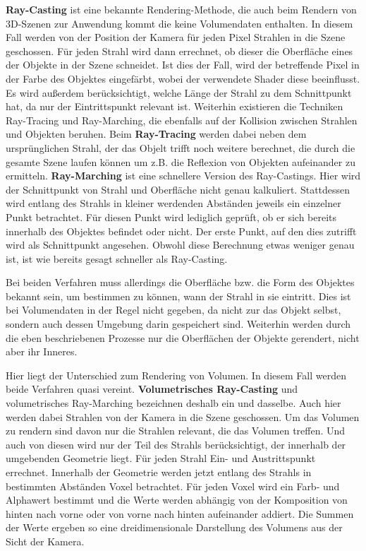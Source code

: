 \textbf{Ray-Casting} ist eine bekannte Rendering-Methode, die auch beim Rendern von 3D-Szenen zur Anwendung kommt die keine Volumendaten enthalten.
In diesem Fall werden von der Position der Kamera für jeden Pixel Strahlen in die Szene geschossen. Für jeden Strahl wird dann errechnet, ob dieser die Oberfläche eines der Objekte in der Szene schneidet. Ist dies der Fall, wird der betreffende Pixel in der Farbe des Objektes eingefärbt, wobei der verwendete Shader diese beeinflusst. Es wird außerdem berücksichtigt, welche Länge der Strahl zu dem Schnittpunkt hat, da nur der Eintrittspunkt relevant ist.
Weiterhin existieren die Techniken Ray-Tracing und Ray-Marching, die ebenfalls auf der Kollision zwischen Strahlen und Objekten beruhen.
Beim \textbf{Ray-Tracing} werden dabei neben dem ursprünglichen Strahl, der das Objelt trifft noch weitere berechnet, die durch die gesamte Szene laufen können um z.B. die Reflexion von Objekten aufeinander zu ermitteln. 
\textbf{Ray-Marching} ist eine schnellere Version des Ray-Castings. Hier wird der Schnittpunkt von Strahl und Oberfläche nicht genau kalkuliert. Stattdessen wird entlang des Strahls in kleiner werdenden Abständen jeweils ein einzelner Punkt betrachtet. Für diesen Punkt wird lediglich geprüft, ob er sich bereits innerhalb des Objektes befindet oder nicht. Der erste Punkt, auf den dies zutrifft wird als Schnittpunkt angesehen. Obwohl diese Berechnung etwas weniger genau ist, ist wie bereits gesagt schneller als Ray-Casting.

Bei beiden Verfahren muss allerdings die Oberfläche bzw. die Form des Objektes bekannt sein, um bestimmen zu können, wann der Strahl in sie eintritt. Dies ist bei Volumendaten in der Regel nicht gegeben, da nicht zur das Objekt selbst, sondern auch dessen Umgebung darin gespeichert sind. Weiterhin werden durch die eben beschriebenen Prozesse nur die Oberflächen der Objekte gerendert, nicht aber ihr Inneres.

Hier liegt der Unterschied zum Rendering von Volumen. In diesem Fall werden beide Verfahren quasi vereint. \textbf{Volumetrisches Ray-Casting} und volumetrisches Ray-Marching bezeichnen deshalb ein und dasselbe. Auch hier werden dabei Strahlen von der Kamera in die Szene geschossen. Um das Volumen zu rendern sind davon nur die Strahlen relevant, die das Volumen treffen. Und auch von diesen wird nur der Teil des Strahls berücksichtigt, der innerhalb der umgebenden Geometrie liegt. Für jeden Strahl Ein- und Austrittspunkt errechnet. Innerhalb der Geometrie werden jetzt entlang des Strahls in bestimmten Abständen Voxel betrachtet. Für jeden Voxel wird ein Farb- und Alphawert bestimmt und die Werte werden abhängig von der Komposition von hinten nach vorne oder von vorne nach hinten aufeinander addiert. Die Summen der Werte ergeben so eine dreidimensionale Darstellung des Volumens aus der Sicht der Kamera.

